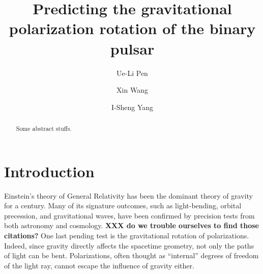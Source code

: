 \documentclass[aps,showpacs,onecolumn,floats,prd,superscriptaddress,nofootinbib]{revtex4}
\begin{document}
\title{Predicting the gravitational polarization rotation of the binary pulsar}

\author{Ue-Li Pen}

\author{Xin Wang}

\author{I-Sheng Yang}

\begin{abstract}
Some abstract stuffs.
\end{abstract}

\maketitle

\section{Introduction}

Einstein's theory of General Relativity has been the dominant theory of gravity for a century. 
Many of its signature outcomes, such as light-bending, orbital precession, and gravitational waves, have been confirmed by precision tests from both astronomy and cosmology. 
{\bf XXX do we trouble ourselves to find those citations?}
One last pending test is the gravitational rotation of polarizations. 
Indeed, since gravity directly affects the spacetime geometry, not only the paths of light can be bent.  
Polarizations, often thought as ``internal'' degrees of freedom of the light ray, cannot escape the influence of gravity either.
\end{document}
